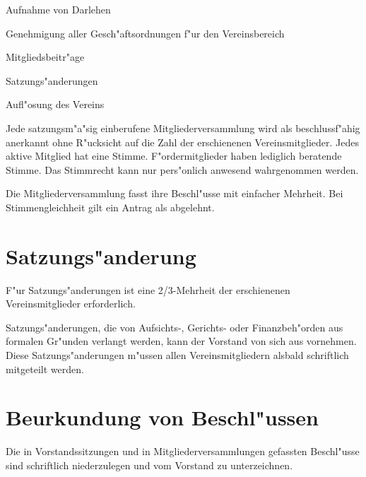 \documentclass[a5paper, ngerman, 10pt]{scrreprt}
\begin{document}
\begin{compactenum}[(1)]
\begin{compactenum}[a.]
        \item Aufnahme von Darlehen
        \item Genehmigung aller Gesch"aftsordnungen f"ur den Vereinsbereich
        \item Mitgliedsbeitr"age
        \item Satzungs"anderungen
        \item Aufl"osung des Vereins
    \end{compactenum}
    \item Jede satzungsm"a"sig einberufene Mitgliederversammlung wird als
        beschlussf"ahig anerkannt ohne R"ucksicht auf die Zahl der erschienenen
        Vereinsmitglieder. Jedes aktive Mitglied hat eine Stimme.
        F"ordermitglieder haben lediglich beratende Stimme. Das Stimmrecht kann
        nur pers"onlich anwesend wahrgenommen werden.
    \item Die Mitgliederversammlung fasst ihre Beschl"usse mit einfacher
        Mehrheit. Bei Stimmengleichheit gilt ein Antrag als abgelehnt.
\end{compactenum}


\section{Satzungs"anderung}
\begin{compactenum}[(1)]
    \item F"ur Satzungs"anderungen ist eine 2/3-Mehrheit der erschienenen
        Vereinsmitglieder erforderlich.
    \item Satzungs"anderungen, die von Aufsichts-, Gerichts- oder
        Finanzbeh"orden aus formalen Gr"unden verlangt werden, kann der Vorstand
        von sich aus vornehmen. Diese Satzungs"anderungen m"ussen allen
        Vereinsmitgliedern alsbald schriftlich mitgeteilt werden.
\end{compactenum}


\section{Beurkundung von Beschl"ussen}
Die in Vorstandssitzungen und in Mitgliederversammlungen gefassten Beschl"usse
sind schriftlich niederzulegen und vom Vorstand zu unterzeichnen.
\end{document}
